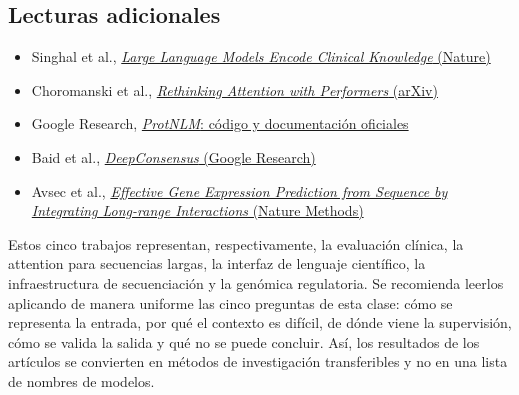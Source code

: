 \documentclass[a4paper]{article}
\begin{document}
\subsection{Lecturas adicionales}

\begin{itemize}
  \item Singhal et al., \href{https://www.nature.com/articles/s41586-023-06291-2}{\emph{Large Language Models Encode Clinical Knowledge} (Nature)}
  \item Choromanski et al., \href{https://arxiv.org/abs/2009.14794}{\emph{Rethinking Attention with Performers} (arXiv)}
  \item Google Research, \href{https://github.com/google-research/google-research/tree/master/protnlm}{\emph{ProtNLM}: código y documentación oficiales}
  \item Baid et al., \href{https://research.google/pubs/deepconsensus-improves-the-accuracy-of-sequences-with-a-gap-aware-sequence-transformer/}{\emph{DeepConsensus} (Google Research)}
  \item Avsec et al., \href{https://www.nature.com/articles/s41592-021-01252-x}{\emph{Effective Gene Expression Prediction from Sequence by Integrating Long-range Interactions} (Nature Methods)}
\end{itemize}

Estos cinco trabajos representan, respectivamente, la evaluación clínica, la attention para secuencias largas, la interfaz de lenguaje científico, la infraestructura de secuenciación y la genómica regulatoria. Se recomienda leerlos aplicando de manera uniforme las cinco preguntas de esta clase: cómo se representa la entrada, por qué el contexto es difícil, de dónde viene la supervisión, cómo se valida la salida y qué no se puede concluir. Así, los resultados de los artículos se convierten en métodos de investigación transferibles y no en una lista de nombres de modelos.
\end{document}

